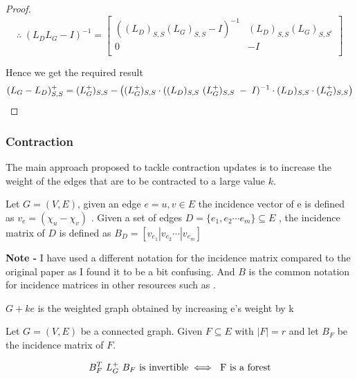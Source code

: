 \begin{proof}
$$\therefore \; (L_DL_G - I)^{-1} = 
\begin{bmatrix}
((L_D)_{S,S} (L_G)_{S,S} - I)^{-1} & (L_D)_{S,S}(L_G)_{S,S^c} \\
0 & -I \\
\end{bmatrix}
$$

Hence we get the required result 
  $$ (L_G - L_D)_{S,S}^+ = (L_{G}^{+})_{S,S} - \left( (L_{G}^{+})_{S,S} \cdot ((L_D)_{S,S} \  (L_{G}^{+})_{S,S} \; - \; I)^{-1} \cdot (L_D)_{S,S} \cdot (L_{G}^{+})_{S,S} \right) $$ 
  
\end{proof}


\subsubsection{Contraction}

The main approach proposed to tackle contraction updates is to increase the weight of the edges that are to be contracted to a large value $k$. 

\begin{HXd}
Let $G = (V,E)$, given an edge $e = {u,v} \in E$ the incidence vector of e is defined as $v_e = (\chi_u - \chi_v)$ . Given a set of edges $D = \{e_1, e_2 \cdots e_m\} \subseteq E$ , the incidence matrix of $D$ is defined as $B_D = [v_{e_1} | v_{e_2} \cdots | v_{e_m}]$ 

\textbf{Note - } I have used a different notation for the incidence matrix compared to the original paper as I found it to be a bit confusing. And $B$ is the common notation for incidence matrices in other resources such as \citet{TCS-054}. 

\end{HXd}

\begin{HXd}[$G + ke$]
 $G + ke$ is the weighted graph obtained by increasing e's weight by k
\end{HXd}


\begin{HXl}
 Let $G = (V, E)$ be a connected graph. Given $F \subseteq E$ with $|F| = r$ and let $B_F$ be the incidence matrix of $F$.
 
 $$ B_F^T \ L_{G}^{+} \ B_F \ \text{is invertible} \iff \text{ F is a forest} $$
\end{HXl}

